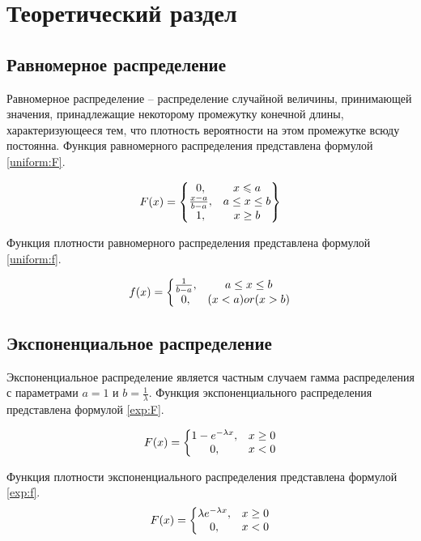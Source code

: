 \chapter{Теоретический раздел}

\section{Равномерное распределение}

Равномерное распределение -- распределение случайной величины, принимающей значения, принадлежащие некоторому промежутку конечной длины, характеризующееся тем, что плотность вероятности на этом промежутке всюду постоянна. Функция равномерного распределения представлена формулой \ref{uniform:F}.

\begin{equation}\label{uniform:F}
F(x) = \begin{Bmatrix}
$$
	0, & x\leqslant a \\
	\frac{x - a}{b - a}, & a\leq x\leq b \\
	1, & x\geq b
$$
\end{Bmatrix}
\end{equation}

Функция плотности равномерного распределения представлена формулой \ref{uniform:f}.

\begin{equation}\label{uniform:f}
f(x) = \left\{\begin{matrix}
$$
	\frac{1}{b - a}, & a\leq x\leq b \\
	0, & (x < a) or (x > b)
$$
\end{matrix}\right.
\end{equation}

\section{Экспоненциальное распределение}

Экспоненциальное распределение является частным случаем гамма распределения с параметрами $a = 1$ и  $b = \frac{1}{\lambda}$.
Функция экспоненциального распределения представлена формулой \ref{exp:F}.

\begin{equation}\label{exp:F}
F(x) = \left\{\begin{matrix}
$$
1 - e^{-\lambda x}, & x \geq 0 \\
0, & x < 0
$$
\end{matrix}\right.
\end{equation} 

Функция плотности экспоненциального распределения представлена формулой \ref{exp:f}.
\begin{equation}\label{exp:f}
F(x) = \left\{\begin{matrix}
$$
\lambda e^{-\lambda x}, & x \geq 0 \\
0, & x < 0
$$
\end{matrix}\right.
\end{equation}
